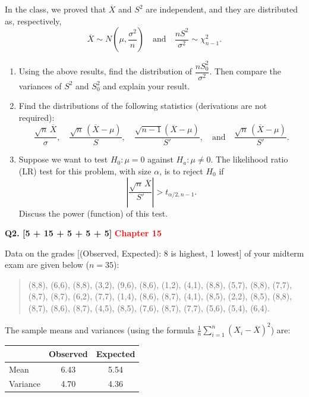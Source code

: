 \documentclass[11pt]{article}
\begin{document}
In the class, we proved that $\overline X$ and $S^2$ are independent, and they are distributed as, respectively,
\[
\overline X\sim N\!\left(\mu,\frac{\sigma^2}{n}\right)
\quad\text{and}\quad
\frac{nS^2}{\sigma^2}\sim\chi^2_{n-1}.
\]

\begin{enumerate}
\item[(i)] Using the above results, find the distribution of $\dfrac{nS_0^2}{\sigma^2}$. Then compare the variances of $S^2$ and $S_0^2$ and explain your result.

\item[(ii)] Find the distributions of the following statistics (derivations are not required):
\[
\frac{\sqrt n\,\overline X}{\sigma},\quad
\frac{\sqrt n\,(\overline X-\mu)}{S},\quad
\frac{\sqrt{n-1}(\overline X-\mu)}{S'},\quad\text{and}\quad
\frac{\sqrt n\,(\overline X-\mu)}{S'}.
\]

\item[(iii)] Suppose we want to test $H_0:\mu=0$ against $H_a:\mu\neq 0$. The likelihood ratio (LR) test for this problem, with size $\alpha$, is to reject $H_0$ if
\[
\left|\frac{\sqrt n\,\overline X}{S'}\right|>t_{\alpha/2,n-1}.
\]
Discuss the power (function) of this test.
\end{enumerate}

\bigskip

\textbf{Q2. [5 + 15 + 5 + 5 + 5]} \textbf{\textcolor{red}{Chapter 15}}

Data on the grades [(Observed, Expected): 8 is highest, 1 lowest] of your midterm exam are given below ($n=35$):

\begin{quote}\small
(8,8), (6,6), (8,8), (3,2), (9,6), (8,6), (1,2), (4,1),
(8,8), (5,7), (8,8), (7,7), (8,7), (8,7), (6,2), (7,7),
(1,4), (8,6), (8,7), (4,1), (8,5), (2,2), (8,5), (8,8),
(8,7), (8,6), (8,7), (4,5), (8,5), (7,6), (8,7), (7,7),
(5,6), (5,4), (6,4).
\end{quote}

The sample means and variances (using the formula $\frac1n\sum_{i=1}^n(X_i-\overline X)^2$) are:

\begin{center}
\begin{tabular}{|l|c|c|}
\hline
 & Observed & Expected \\
\hline
Mean & 6.43 & 5.54 \\
Variance & 4.70 & 4.36 \\
\hline
\end{tabular}
\end{center}
\end{document}
